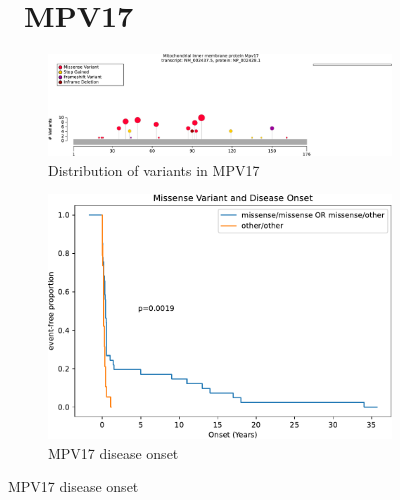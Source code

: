 \begin{figure}[htbp]
\section*{ MPV17}
\centering
\begin{subfigure}[b]{0.95\textwidth}
\centering
\includegraphics[width=\textwidth]{ img/MPV17_protein_diagram.pdf} 
\captionsetup{justification=raggedright,singlelinecheck=false}
\caption{Distribution of variants in MPV17}
\end{subfigure}

\vspace{2em}

\begin{subfigure}[b]{0.3\textwidth}
\centering
\includegraphics[width=\textwidth]{ img/MPV17_stats.pdf} 
\captionsetup{justification=raggedright,singlelinecheck=false}
\caption{MPV17 disease onset}
\end{subfigure}

\vspace{0.2em}


\end{figure}
